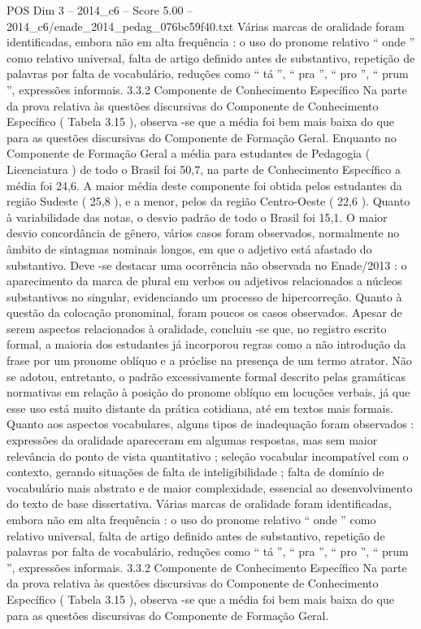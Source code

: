 \begin{textsample}{POS Dim 3 – 2014\_c6 – Score 5.00 – 2014\_c6/enade\_2014\_pedag\_076bc59f40.txt}
Várias marcas de oralidade foram identificadas, embora não em alta frequência : o uso do pronome relativo “ onde ” como relativo universal, falta de artigo definido antes de substantivo, repetição de palavras por falta de vocabulário, reduções como “ tá ”, “ pra ”, “ pro ”, “ prum ”, expressões informais. 3.3.2 Componente de Conhecimento Específico Na parte da prova relativa às questões discursivas do Componente de Conhecimento Específico ( Tabela 3.15 ), observa -se que a média foi bem mais baixa do que para as questões discursivas do Componente de Formação Geral.
Enquanto no Componente de Formação Geral a média para estudantes de Pedagogia ( Licenciatura ) de todo o Brasil foi 50,7, na parte de Conhecimento Específico a média foi 24,6.
A maior média deste componente foi obtida pelos estudantes da região Sudeste ( 25,8 ), e a menor, pelos da região Centro-Oeste ( 22,6 ).
Quanto à variabilidade das notas, o desvio padrão de todo o Brasil foi 15,1.
O maior desvio concordância de gênero, vários casos foram observados, normalmente no âmbito de sintagmas nominais longos, em que o adjetivo está afastado do substantivo.
Deve -se destacar uma ocorrência não observada no Enade/2013 : o aparecimento da marca de plural em verbos ou adjetivos relacionados a núcleos substantivos no singular, evidenciando um processo de hipercorreção.
Quanto à questão da colocação pronominal, foram poucos os casos observados.
Apesar de serem aspectos relacionados à oralidade, concluiu -se que, no registro escrito formal, a maioria dos estudantes já incorporou regras como a não introdução da frase por um pronome oblíquo e a próclise na presença de um termo atrator.
Não se adotou, entretanto, o padrão excessivamente formal descrito pelas gramáticas normativas em relação à posição do pronome oblíquo em locuções verbais, já que esse uso está muito distante da prática cotidiana, até em textos mais formais.
Quanto aos aspectos vocabulares, alguns tipos de inadequação foram observados : expressões da oralidade apareceram em algumas respostas, mas sem maior relevância do ponto de vista quantitativo ; seleção vocabular incompatível com o contexto, gerando situações de falta de inteligibilidade ; falta de domínio de vocabulário mais abstrato e de maior complexidade, essencial ao desenvolvimento do texto de base dissertativa.
Várias marcas de oralidade foram identificadas, embora não em alta frequência : o uso do pronome relativo “ onde ” como relativo universal, falta de artigo definido antes de substantivo, repetição de palavras por falta de vocabulário, reduções como “ tá ”, “ pra ”, “ pro ”, “ prum ”, expressões informais. 3.3.2 Componente de Conhecimento Específico Na parte da prova relativa às questões discursivas do Componente de Conhecimento Específico ( Tabela 3.15 ), observa -se que a média foi bem mais baixa do que para as questões discursivas do Componente de Formação Geral.

\end{textsample}
